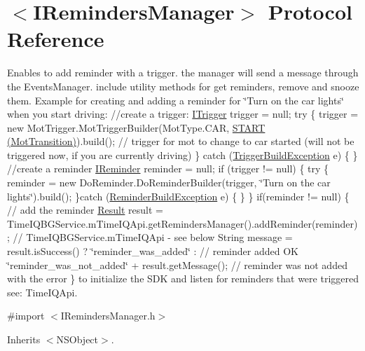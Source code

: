 \hypertarget{protocol_i_reminders_manager-p}{}\section{$<$I\+Reminders\+Manager$>$ Protocol Reference}
\label{protocol_i_reminders_manager-p}


Enables to add reminder with a trigger. the manager will send a message through the Events\+Manager. include utility methods for get reminders, remove and snooze them. Example for creating and adding a reminder for \char`\"{}\+Turn on the car lights\char`\"{} when you start driving\+: //create a trigger\+: \hyperlink{protocol_i_trigger-p}{I\+Trigger} trigger = null; try \{ trigger = new Mot\+Trigger.\+Mot\+Trigger\+Builder(Mot\+Type.\+C\+A\+R, \hyperlink{interface_mot_transition_aeb5b28b53b3593273c47a4e1a5c2210b}{S\+T\+A\+R\+T (\+Mot\+Transition)}).build(); // trigger for mot to change to car started (will not be triggered now, if you are currently driving) \} catch (\hyperlink{interface_trigger_build_exception}{Trigger\+Build\+Exception} e) \{ \} //create a reminder \hyperlink{protocol_i_reminder-p}{I\+Reminder} reminder = null; if (trigger != null) \{ try \{ reminder = new Do\+Reminder.\+Do\+Reminder\+Builder(trigger, \char`\"{}\+Turn on the car lights\char`\"{}).build(); \}catch (\hyperlink{interface_reminder_build_exception}{Reminder\+Build\+Exception} e) \{ \} \} if(reminder != null) \{ // add the reminder \hyperlink{interface_result}{Result} result = Time\+I\+Q\+B\+G\+Service.\+m\+Time\+I\+Q\+Api.\+get\+Reminders\+Manager().add\+Reminder(reminder); // Time\+I\+Q\+B\+G\+Service.\+m\+Time\+I\+Q\+Api -\/ see below String message = result.\+is\+Success() ? \char`\"{}reminder\+\_\+was\+\_\+added\char`\"{} \+: // reminder added O\+K \char`\"{}reminder\+\_\+was\+\_\+not\+\_\+added\char`\"{} + result.\+get\+Message(); // reminder was not added with the error \} to initialize the S\+D\+K and listen for reminders that were triggered see\+: Time\+I\+Q\+Api.  




{\ttfamily \#import $<$I\+Reminders\+Manager.\+h$>$}



Inherits $<$\+N\+S\+Object$>$.

